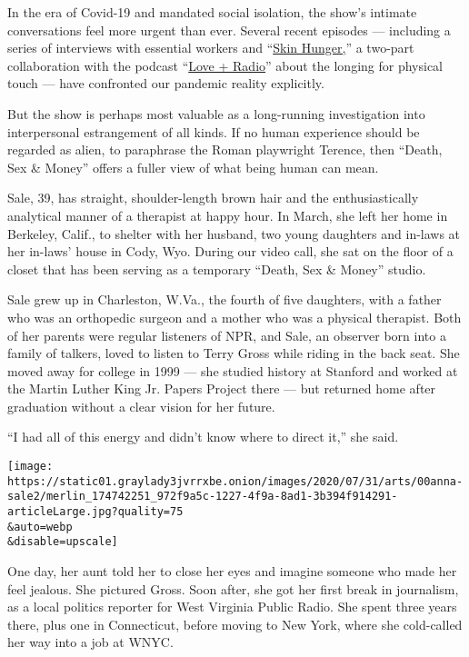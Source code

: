 In the era of Covid-19 and mandated social isolation, the show's
intimate conversations feel more urgent than ever. Several recent
episodes --- including a series of interviews with essential workers and
``\href{https://www.wnycstudios.org/podcasts/deathsexmoney/episodes/skin-hunger-love-radio-part-1}{Skin
Hunger,}'' a two-part collaboration with the podcast
``\href{https://loveandradio.org/}{Love + Radio}'' about the longing for
physical touch --- have confronted our pandemic reality explicitly.

But the show is perhaps most valuable as a long-running investigation
into interpersonal estrangement of all kinds. If no human experience
should be regarded as alien, to paraphrase the Roman playwright Terence,
then ``Death, Sex \& Money'' offers a fuller view of what being human
can mean.

Sale, 39, has straight, shoulder-length brown hair and the
enthusiastically analytical manner of a therapist at happy hour. In
March, she left her home in Berkeley, Calif., to shelter with her
husband, two young daughters and in-laws at her in-laws' house in Cody,
Wyo. During our video call, she sat on the floor of a closet that has
been serving as a temporary ``Death, Sex \& Money'' studio.

Sale grew up in Charleston, W.Va., the fourth of five daughters, with a
father who was an orthopedic surgeon and a mother who was a physical
therapist. Both of her parents were regular listeners of NPR, and Sale,
an observer born into a family of talkers, loved to listen to Terry
Gross while riding in the back seat. She moved away for college in 1999
--- she studied history at Stanford and worked at the Martin Luther King
Jr. Papers Project there --- but returned home after graduation without
a clear vision for her future.

``I had all of this energy and didn't know where to direct it,'' she
said.

\texttt{[image: https://static01.graylady3jvrrxbe.onion/images/2020/07/31/arts/00anna-sale2/merlin\_174742251\_972f9a5c-1227-4f9a-8ad1-3b394f914291-articleLarge.jpg?quality=75\\\&auto=webp\\\&disable=upscale]}

One day, her aunt told her to close her eyes and imagine someone who
made her feel jealous. She pictured Gross. Soon after, she got her first
break in journalism, as a local politics reporter for West Virginia
Public Radio. She spent three years there, plus one in Connecticut,
before moving to New York, where she cold-called her way into a job at
WNYC.

